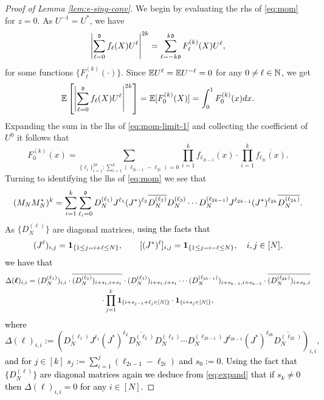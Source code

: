 \documentclass{amsart}
\numberwithin{equation}{section}
\def\corABrev{\textcolor{black}}
\newcommand{\abbr}[1]{{\sc\lowercase{#1}}}
\begin{document}
\begin{proof}[Proof of Lemma \ref{lem:e-sing-conv}]
We begin by evaluating
the \abbr{RHS} of \eqref{eq:mom} for $z=0$. As $U^{-1}=U^*$, we have
\begin{equation}\label{eq:mom-limit-1}
\left|\sum_{\ell=0}^{\mathfrak{d}} f_\ell(X) U^\ell \right|^{2k}= \sum_{\ell=-k\mathfrak{d}}^{k\mathfrak{d}} F_\ell^{(k)}(X) U^\ell,
\end{equation}
for some functions $\{F_\ell^{(k)}(\cdot)\}$. Since $\mathbb E U^\ell=\mathbb E U^{-\ell}=0$
for any $0\neq  \ell \in \mathbb N$, we get
\begin{equation}\label{eq:mom-limit-2}
\mathbb E\left[\left|\sum_{\ell=0}^{\mathfrak{d}} f_\ell(X) U^\ell \right|^{2k}\right] = \mathbb E[F_0^{(k)}(X)] = \int_0^1 F_0^{(k)}(x) dx.
\end{equation}
Expanding the sum in the \abbr{LHS} of \eqref{eq:mom-limit-1} and collecting the coefficient of $U^0$ it follows that
\begin{equation}\label{eq:mom-limit-3}
F_0^{(k)}(x)= \sum_{\{\ell_i\}_{i=1}^{2k}: \sum_{i=1}^k (\ell_{2i-1}- \ell_{2i})=0} \prod_{i=1}^k f_{\ell_{2i-1}}(x) \cdot \prod_{i=1}^k \overline{f_{\ell_{2i}}(x)}.
\end{equation}
Turning to identifying the \abbr{LHS} of  \eqref{eq:mom} we see that
\begin{equation}
  \label{eq-BCMD}
(M_N M_N^*)^k = \sum_{i=1}^k \sum_{\ell_i=0}^{\mathfrak{d}} D_N^{(\ell_1)}J^{\ell_1} (J^*)^{\ell_2} \overline{D_N^{(\ell_2)}} D_N^{(\ell_3)} \cdots  D_N^{(\ell_{2k-1})}J^{\ell_{2k-1}} (J^*)^{\ell_{2k}} \overline{D_N^{(\ell_{2k})}}.
\end{equation}
As $\{D_N^{(\ell)}\}$ are diagonal matrices, \corABrev{using the facts that 
\[
(J^\ell)_{i,j} = {\bf 1}_{\{1 \le j = i+\ell \le N\}}, \qquad [(J^*)^\ell]_{i,j} = {\bf 1}_{\{1 \le j = i-\ell \le N\}}, \quad i,j \in [N],
\]
we have that 
\begin{multline}\label{eq:expand}
\Delta ({\bm \ell})_{i,i} = (D_N^{(\ell_1)})_{i,i} \cdot \overline{(D_N^{(\ell_2)})_{i+s_1,i+s_1}} \cdot {(D_N^{(\ell_3)})_{i+s_1,i+s_1}} \cdots (D_N^{(\ell_{2k-1})})_{i+s_{k-1},i+s_{k-1}} \cdot \overline{(D_N^{(\ell_{2k})})_{i+s_k,i}} \\
\cdot \prod_{j=1}^k {\bf 1}_{\{i+s_{j-1}+\ell_j \in [N]\}} \cdot {\bf 1}_{\{i+s_j \in [N]\}},
\end{multline}
where
\[
\Delta({\bm \ell})_{i,i}:=\left(D_N^{(\ell_1)}J^{\ell_1} (J^*)^{\ell_2} \overline{D_N^{(\ell_2)}} D_N^{(\ell_3)} \cdots  D_N^{(\ell_{2k-1})}J^{\ell_{2k-1}} (J^*)^{\ell_{2k}} \overline{D_N^{(\ell_{2k})}}\right)_{i,i},
\]
and for $j \in [k]$ $s_j:=\sum_{i=1}^j (\ell_{2i-1} -\ell_{2i})$ and $s_0:=0$. Using the fact that $\{D_N^{(\ell)}\}$ are diagonal matrices again we deduce from \eqref{eq:expand} that if $s_k \ne 0$ then $\Delta({\bm \ell})_{i,i} =0$ for any $i \in [N]$.} 


\end{proof}
\end{document}
